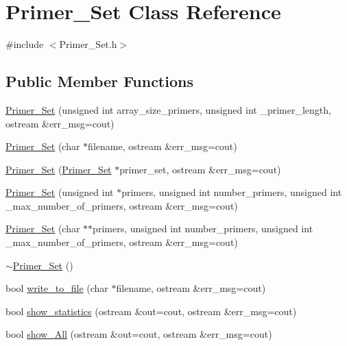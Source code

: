 \hypertarget{class_primer___set}{}\section{Primer\+\_\+\+Set Class Reference}
\label{class_primer___set}


{\ttfamily \#include $<$Primer\+\_\+\+Set.\+h$>$}

\subsection*{Public Member Functions}
\begin{DoxyCompactItemize}
\item 
\mbox{\hyperlink{class_primer___set_ab9db4a9ad37106aac40762b7b4d57d4f}{Primer\+\_\+\+Set}} (unsigned int array\+\_\+size\+\_\+primers, unsigned int \+\_\+primer\+\_\+length, ostream \&err\+\_\+msg=cout)
\item 
\mbox{\hyperlink{class_primer___set_ae81dafc2ac39deb5480f68dac440e88e}{Primer\+\_\+\+Set}} (char $\ast$filename, ostream \&err\+\_\+msg=cout)
\item 
\mbox{\hyperlink{class_primer___set_a47c64ebda73f5a9d34d68f3c116c09cf}{Primer\+\_\+\+Set}} (\mbox{\hyperlink{class_primer___set}{Primer\+\_\+\+Set}} $\ast$primer\+\_\+set, ostream \&err\+\_\+msg=cout)
\item 
\mbox{\hyperlink{class_primer___set_ae3c919cd6aa18e8e2c3e4f5d3ea9a37c}{Primer\+\_\+\+Set}} (unsigned int $\ast$primers, unsigned int number\+\_\+primers, unsigned int \+\_\+max\+\_\+number\+\_\+of\+\_\+primers, ostream \&err\+\_\+msg=cout)
\item 
\mbox{\hyperlink{class_primer___set_aa6e3ae72bc7cd4506b48b09e6591bd0f}{Primer\+\_\+\+Set}} (char $\ast$$\ast$primers, unsigned int number\+\_\+primers, unsigned int \+\_\+max\+\_\+number\+\_\+of\+\_\+primers, ostream \&err\+\_\+msg=cout)
\item 
\mbox{\hyperlink{class_primer___set_aaeefdfa29c69f847f033b47eb43d4e05}{$\sim$\+Primer\+\_\+\+Set}} ()
\item 
bool \mbox{\hyperlink{class_primer___set_a55d08f895a8af207b7e06abf8bf95f99}{write\+\_\+to\+\_\+file}} (char $\ast$filename, ostream \&err\+\_\+msg=cout)
\item 
bool \mbox{\hyperlink{class_primer___set_a86da618d3bafd760ceb21099b168e54c}{show\+\_\+statistics}} (ostream \&out=cout, ostream \&err\+\_\+msg=cout)
\item 
bool \mbox{\hyperlink{class_primer___set_aca0009d54b4b99a0a45d4e4995bb9818}{show\+\_\+\+All}} (ostream \&out=cout, ostream \&err\+\_\+msg=cout)
$$
\end{DoxyCompactItemize}

